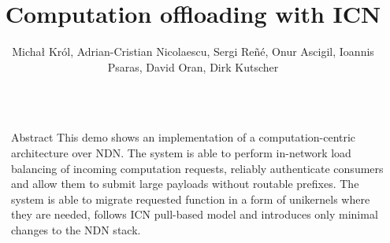 \documentclass[final]{beamer}
\title{Computation offloading with ICN} %
\author{Michał Król, Adrian-Cristian Nicolaescu, Sergi Reñé, Onur Ascigil, Ioannis Psaras, David Oran, Dirk Kutscher} %
\institute{University College London, Network Systems Research \& Design, Huawei} %
\newlength{\sepwid}
\newlength{\onecolwid}
\begin{document}

\setlength{\belowcaptionskip}{2ex} %
\setlength\belowdisplayshortskip{2ex} %

\begin{frame}[t] %

\begin{columns}[t] %

\begin{column}{\sepwid}\end{column} %

\begin{column}{\onecolwid} %


\begin{alertblock}{Abstract}
This demo shows an implementation of a computation-centric architecture over NDN. The system is able to perform in-network load balancing of incoming computation requests, reliably authenticate consumers and allow them to submit large payloads without routable prefixes. The system is able to migrate requested function in a form of unikernels where they are needed, follows ICN pull-based model and introduces only minimal changes to the NDN stack.



\end{alertblock}


\end{column}
\end{columns}
\end{frame}
\end{document}
